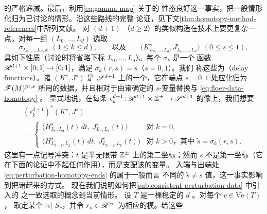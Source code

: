 的\trFiltration{}严格递减。最后，利用\eqref{eq:gamma-map} 关于\trHomotopy{}的%
\trComposition{}性态良好这一事实，把一般情形化归为已讨论的情形。沿这些路线的完整%
论证，见下文\cref{thm:homotopy-method-references}中所列文献。
对\trPseudoholomorphic{} $(d{+}1)$ \trPolygon（$d\ge 2$）的类似构造在技术上要更复杂一点。对每一组%
\trExact\trLagrange\trSubmanifold{} $(L_0,\ldots,L_d)$ 选取
\begin{equation}\label{eq:delay-function-choice}
\sigma_{L_0,\ldots,L_d,k}\ \ (1\le k\le d),
\qquad\text{以及}\qquad
\bigl(K^s_{L_0,\ldots,L_d},J^s_{L_0,\ldots,L_d}\bigr)\ \ (0\le s\le 1),
\end{equation}
具如下性质（讨论时将省略下标 $L_0,\ldots,L_d$）。每个 $\sigma_k$ 是一个\trSmooth{}
函数 $\mathscr{R}^{d+1}\times[0;1]\to[0;1]$，满足 $\sigma_k(r,s)=s$（$s=0,1$）。我们
称这些为\textbf{\trDelayFunction}（delay functions）。诸 $(K^s,J^s)$ 是\trUniversal\trFamily{}
$\mathscr{S}^{d+1}$ 上\trPerturbationDatum{}的一个\trHomotopy，它在端点 $s=0,1$ 处应化归为
$\mathscr{F}(M)^{\mathrm{pr},s}$ 所用的数据，并且相对于由诸\trDelayFunction{}确定的
$s$-变量替换与\trFloerDatum{} \eqref{eq:floer-data-homotopy} \trCompatible{}。
显式地说，在每条\trStriplikeEnd{} $\epsilon^{d+1}_k\colon\mathscr{R}^{d+1}\times\mathbb{Z}^{\pm}
\to\mathscr{S}^{d+1}$ 的像上，我们想要
\begin{equation}\label{eq:perturbation-homotopy-ends}
\begin{split}
(\epsilon^{d+1}_k)^*(K^s,J^s)\qquad\qquad\qquad\qquad\qquad\qquad\quad\\
=\begin{cases}
\bigl(H^s_{L_0,L_d}(t)\,dt,\ J^s_{L_0,L_d}(t)\bigr) & \text{对 } k=0,\\[2pt]
\bigl(H^{\tilde{s}}_{L_{k-1},L_k}(t)\,dt,\ J^{\tilde{s}}_{L_{k-1},L_k}(t)\bigr)
  & \text{对 } k>0\text{，其中 } \tilde{s}=\sigma_k(r,s).
\end{cases}
\end{split}
\end{equation}
这里有一点记号冲突：$t$ 是半无限带 $\mathbb{Z}^{\pm}$ 上的第二坐标；然而 $s$
不是第一坐标（它在下面的论证中不起任何作用），而是支配该\trHomotopy{}的变量。
入端与出端处\eqref{eq:perturbation-homotopy-ends} 的\trFloerDatum{}属于一般而言
不同的 $\tilde{s}\neq s$ 值，这一事实影响到把诸\trSurface{}\trGluing{}起来的方式。
现在我们说明如何把\cref{sub:consistent-perturbation-data} 中引入的%
\trPerturbationDatum{}之一致选取的概念\trAdapted{}到当前情形。
设 $T$ 是一棵稳定的 $d$ \trLeafedTree。对每个\trVertex{} $v\in\mathrm{Ve}(T)$，
取定某个 $|v|$ \trPointedDisc{} $S_v$，并令 $r_v\in\mathscr{R}^{|v|}$ 为相应的模。给这些%
